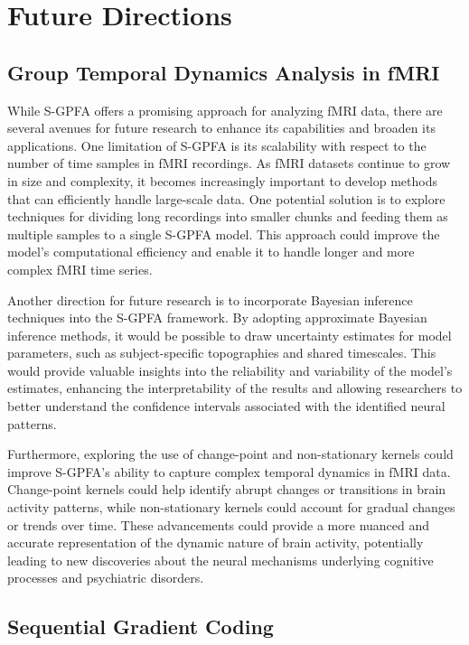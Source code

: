 \section{Future Directions}

\subsection{Group Temporal Dynamics
Analysis in fMRI}

While S-GPFA offers a promising approach for analyzing fMRI data, there are several avenues for future research to enhance its capabilities and broaden its applications. One limitation of S-GPFA is its scalability with respect to the number of time samples in fMRI recordings. As fMRI datasets continue to grow in size and complexity, it becomes increasingly important to develop methods that can efficiently handle large-scale data. One potential solution is to explore techniques for dividing long recordings into smaller chunks and feeding them as multiple samples to a single S-GPFA model. This approach could improve the model's computational efficiency and enable it to handle longer and more complex fMRI time series.

Another direction for future research is to incorporate Bayesian inference techniques into the S-GPFA framework. By adopting approximate Bayesian inference methods, it would be possible to draw uncertainty estimates for model parameters, such as subject-specific topographies and shared timescales. This would provide valuable insights into the reliability and variability of the model's estimates, enhancing the interpretability of the results and allowing researchers to better understand the confidence intervals associated with the identified neural patterns.

Furthermore, exploring the use of change-point and non-stationary kernels could improve S-GPFA's ability to capture complex temporal dynamics in fMRI data. Change-point kernels could help identify abrupt changes or transitions in brain activity patterns, while non-stationary kernels could account for gradual changes or trends over time. These advancements could provide a more nuanced and accurate representation of the dynamic nature of brain activity, potentially leading to new discoveries about the neural mechanisms underlying cognitive processes and psychiatric disorders.

\subsection{Sequential Gradient Coding}

